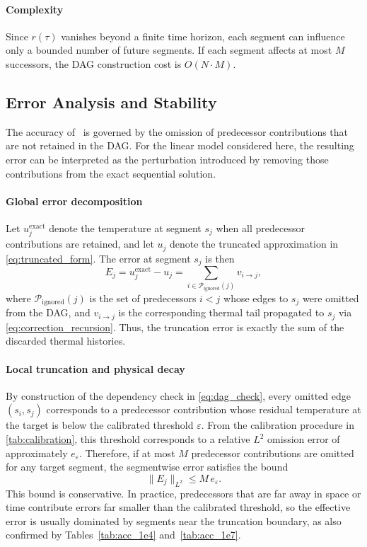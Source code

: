 \documentclass[conference]{IEEEtran}
\begin{document}
\paragraph{Complexity}
Since $r(\tau)$ vanishes beyond a finite time horizon, each segment can influence only a bounded number of future segments. If each segment affects at most $M$ successors, the DAG construction cost is $O(N\cdot M)$.

\subsection{Error Analysis and Stability}
\label{seq:error_analysis}

The accuracy of \method\ is governed by the omission of predecessor contributions that are not retained in the DAG. For the linear model considered here, the resulting error can be interpreted as the perturbation introduced by removing those contributions from the exact sequential solution.

\paragraph{Global error decomposition}
Let $u_j^{\mathrm{exact}}$ denote the temperature at segment $s_j$ when all predecessor contributions are retained, and let $u_j$ denote the truncated approximation in \cref{eq:truncated_form}. The error at segment $s_j$ is then
\begin{equation}
E_j = u_j^{\mathrm{exact}} - u_j
    = \sum_{i \in \mathcal{P}_{\mathrm{ignored}}(j)} v_{i \to j},
\label{eq:global_error_sum}
\end{equation}
where $\mathcal{P}_{\mathrm{ignored}}(j)$ is the set of predecessors $i<j$ whose edges to $s_j$ were omitted from the DAG, and $v_{i\to j}$ is the corresponding thermal tail propagated to $s_j$ via \cref{eq:correction_recursion}. Thus, the truncation error is exactly the sum of the discarded thermal histories.

\paragraph{Local truncation and physical decay}
By construction of the dependency check in \cref{eq:dag_check}, every omitted edge $(s_i,s_j)$ corresponds to a predecessor contribution whose residual temperature at the target is below the calibrated threshold $\varepsilon$. From the calibration procedure in \cref{tab:calibration}, this threshold corresponds to a relative $L^2$ omission error of approximately $e_\varepsilon$. Therefore, if at most $M$ predecessor contributions are omitted for any target segment, the segmentwise error satisfies the bound
\begin{equation}
\|E_j\|_{L^2} \le M\, e_\varepsilon.
\label{eq:global_error_bound}
\end{equation}
This bound is conservative. In practice, predecessors that are far away in space or time contribute errors far smaller than the calibrated threshold, so the effective error is usually dominated by segments near the truncation boundary, as also confirmed by Tables~\ref{tab:acc_1e4} and~\ref{tab:acc_1e7}.
\end{document}
